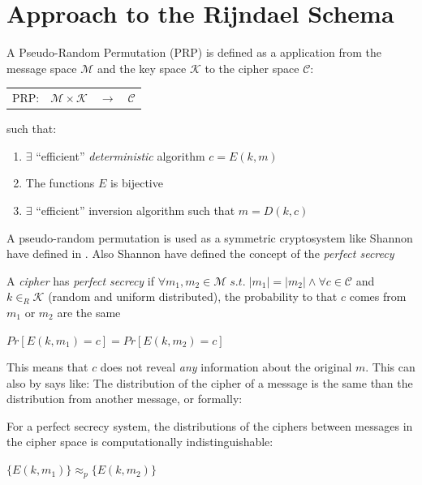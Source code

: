 \documentclass[10pt,a4paper,twoside]{llncs}
\begin{document}
\section{Approach to the Rijndael Schema}
\begin{definition}\label{def:PRP}
 A Pseudo-Random Permutation (PRP) is defined as a application from the message space $\mathcal{M}$ and the key space $\mathcal{K}$ to the cipher space $\mathcal{C}$:
 \begin{center}
  \begin{tabular}{llll}
   PRP: & $\mathcal{M} \times \mathcal{K}$ & $\rightarrow$ & $\mathcal{C}$ \\
  \end{tabular}
 \end{center}
 such that:
 \begin{enumerate}
  \item $\exists$ ``efficient'' \emph{deterministic} algorithm $c=E(k,m)$
  \item The functions $E$ is bijective
  \item $\exists$ ``efficient'' inversion algorithm such that $m=D(k,c)$
 \end{enumerate}
\end{definition}

A pseudo-random permutation is used as a symmetric cryptosystem like Shannon have defined in \cite{shannon-comTheorySecSys}. Also Shannon have defined the concept of the \emph{perfect secrecy}
\begin{definition}\label{def:shannonPerfectSecrecy}
 A \emph{cipher} has \emph{perfect secrecy} if $\forall m_1, m_2 \in \mathcal{M} \;s.t.\; \left| m_1 \right| = \left| m_2 \right| \wedge \forall c \in \mathcal{C}$ and  $k\in_R\mathcal{K}$ (random and uniform distributed), the probability to that $c$ comes from $m_1$ or $m_2$ are the same
 \begin{center}
  $Pr[E(k,m_1)=c] = Pr[E(k,m_2)=c]$
 \end{center}
\end{definition}

This means that $c$ does not reveal \emph{any} information about the original $m$. This can also by says like: The distribution of the cipher of a message is the same than the distribution from another message, or formally:
\begin{definition}
 For a perfect secrecy system, the distributions of the ciphers between messages in the cipher space is computationally indistinguishable:
 \begin{center}
  $\{ E(k,m_1) \} \approx_p \{ E(k,m_2) \} $
 \end{center}
\end{definition}
\end{document}
